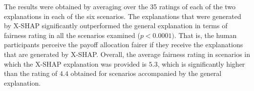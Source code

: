 \documentclass[letterpaper]{article} %
\begin{document}



The results were obtained by averaging over the 35 ratings of each of the two explanations in each of the six scenarios. The explanations that were generated by X-SHAP significantly outperformed the general explanation in terms of fairness rating in all the scenarios examined ($p<0.0001)$. That is, the human participants perceive the payoff allocation fairer if they receive the explanations that are generated by X-SHAP. Overall, the average fairness rating in scenarios in which the X-SHAP explanation was provided is $5.3$, which is significantly higher than the rating of $4.4$ obtained for scenarios accompanied by the general explanation.


\end{document}
